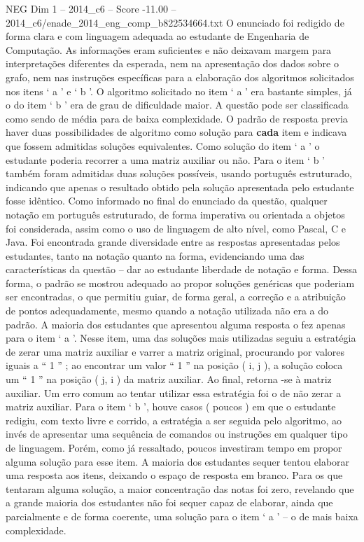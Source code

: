\begin{textsample}{NEG Dim 1 – 2014\_c6 – Score -11.00 – 2014\_c6/enade\_2014\_eng\_comp\_b822534664.txt}
O enunciado foi redigido de forma clara e com linguagem adequada ao estudante de Engenharia de Computação.
As informações eram suficientes e não deixavam margem para interpretações diferentes da esperada, nem na apresentação dos dados sobre o grafo, nem nas instruções específicas para a elaboração dos algoritmos solicitados nos itens ‘ a ’ e ‘ b ’.
O algoritmo solicitado no item ‘ a ’ era bastante simples, já o do item ‘ b ’ era de grau de dificuldade maior.
A questão pode ser classificada como sendo de média para de baixa complexidade.
O padrão de resposta previa haver duas possibilidades de algoritmo como solução para \textbf{cada} item e indicava que fossem admitidas soluções equivalentes.
Como solução do item ‘ a ’ o estudante poderia recorrer a uma matriz auxiliar ou não.
Para o item ‘ b ’ também foram admitidas duas soluções possíveis, usando português estruturado, indicando que apenas o resultado obtido pela solução apresentada pelo estudante fosse idêntico.
Como informado no final do enunciado da questão, qualquer notação em português estruturado, de forma imperativa ou orientada a objetos foi considerada, assim como o uso de linguagem de alto nível, como Pascal, C e Java.
Foi encontrada grande diversidade entre as respostas apresentadas pelos estudantes, tanto na notação quanto na forma, evidenciando uma das características da questão – dar ao estudante liberdade de notação e forma.
Dessa forma, o padrão se mostrou adequado ao propor soluções genéricas que poderiam ser encontradas, o que permitiu guiar, de forma geral, a correção e a atribuição de pontos adequadamente, mesmo quando a notação utilizada não era a do padrão.
A maioria dos estudantes que apresentou alguma resposta o fez apenas para o item ‘ a ’.
Nesse item, uma das soluções mais utilizadas seguiu a estratégia de zerar uma matriz auxiliar e varrer a matriz original, procurando por valores iguais a “ 1 ” ; ao encontrar um valor “ 1 ” na posição ( i, j ), a solução coloca um “ 1 ” na posição ( j, i ) da matriz auxiliar.
Ao final, retorna -se à matriz auxiliar.
Um erro comum ao tentar utilizar essa estratégia foi o de não zerar a matriz auxiliar.
Para o item ‘ b ’, houve casos ( poucos ) em que o estudante redigiu, com texto livre e corrido, a estratégia a ser seguida pelo algoritmo, ao invés de apresentar uma sequência de comandos ou instruções em qualquer tipo de linguagem.
Porém, como já ressaltado, poucos investiram tempo em propor alguma solução para esse item.
A maioria dos estudantes sequer tentou elaborar uma resposta aos itens, deixando o espaço de resposta em branco.
Para os que tentaram alguma solução, a maior concentração das notas foi zero, revelando que a grande maioria dos estudantes não foi sequer capaz de elaborar, ainda que parcialmente e de forma coerente, uma solução para o item ‘ a ’ – o de mais baixa complexidade.

\end{textsample}
